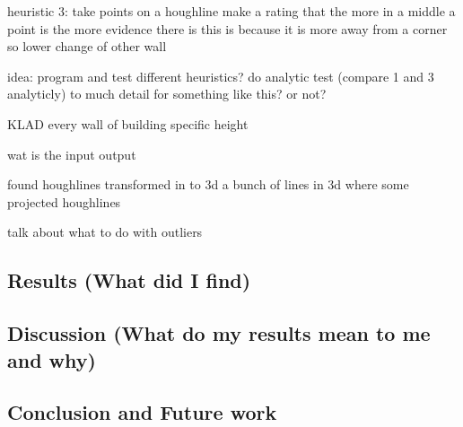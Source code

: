 heuristic 3:
take points on a houghline
make a rating that the more in a middle a point is the more evidence there is
this is because it is more away from a corner so lower change of other wall

idea:
program and test different heuristics?
do analytic test (compare 1 and 3 analyticly)
	to much detail for something like this? or not?


KLAD
every wall of building specific height


wat is the input
output

found houghlines transformed in to 3d
a bunch of lines in 3d where some
projected houghlines


talk about
what to do with outliers

\subsection{Results (What did I find)}
\subsection{Discussion (What do my results mean to me and why)}
\subsection{Conclusion and Future work}


